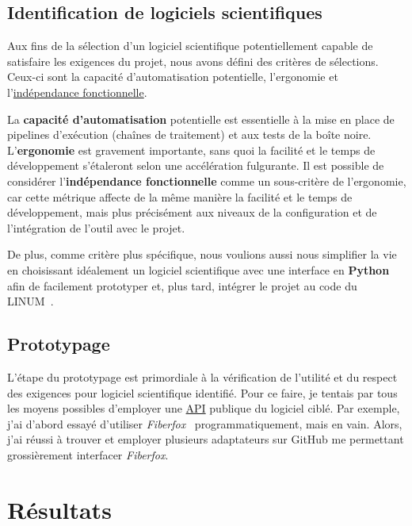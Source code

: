 \documentclass{article}
\begin{document}
  \subsection{Identification de logiciels scientifiques}
  \label{subsec:software-search}

  Aux fins de la sélection d'un logiciel scientifique potentiellement capable de satisfaire les exigences du projet, nous avons défini des critères de sélections.
  Ceux-ci sont la capacité d'automatisation potentielle, l'ergonomie et l'\href{https://fr.wikipedia.org/wiki/Ind%C3%A9pendance_fonctionnelle}{indépendance
  fonctionnelle}.

  La \textbf{capacité d'automatisation} potentielle est essentielle à la mise en place de pipelines d'exécution (chaînes de traitement) et aux tests de la boîte noire.
  L'\textbf{ergonomie} est gravement importante, sans quoi la facilité et le temps de développement s'étaleront selon une accélération fulgurante.
  Il est possible de considérer l'\textbf{indépendance fonctionnelle} comme un sous-critère de l'ergonomie, car cette métrique affecte de la même manière la facilité
  et le temps de développement, mais plus précisément aux niveaux de la configuration et de l'intégration de l'outil avec le projet.

  De plus, comme critère plus spécifique, nous voulions aussi nous simplifier la vie en choisissant idéalement un logiciel scientifique avec une interface en
  \textbf{Python} afin de facilement prototyper et, plus tard, intégrer le projet au code du LINUM~.

  \subsection{Prototypage}
  \label{subsec:prototyping}

  L'étape du prototypage est primordiale à la vérification de l'utilité et du respect des exigences pour logiciel scientifique identifié.
  Pour ce faire, je tentais par tous les moyens possibles d'employer une \href{https://fr.wikipedia.org/wiki/Interface_de_programmation}{API} publique du logiciel ciblé.
  Par exemple, j'ai d'abord essayé d'utiliser \textit{Fiberfox}~\cite{neher2014fiberfox} programmatiquement, mais en vain.
  Alors, j'ai réussi à trouver et employer plusieurs adaptateurs sur GitHub me permettant grossièrement interfacer \textit{Fiberfox}.


  \section{Résultats}
  \label{sec:results}
\end{document}
